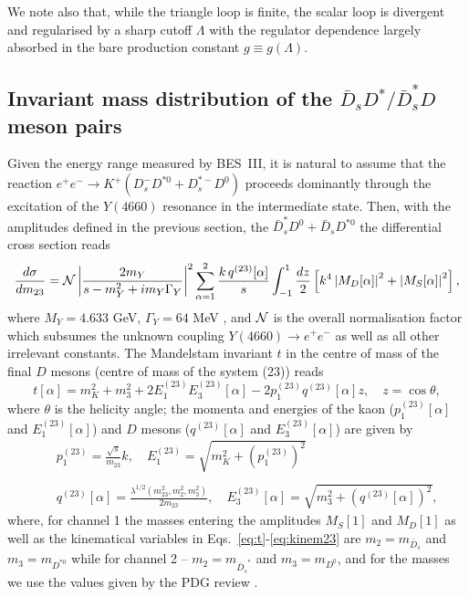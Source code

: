 \documentclass[preprint,12pt,3p]{elsarticle}
\newcommand{\be}{\begin{equation}}
\newcommand{\ee}{\end{equation}}
\newcommand{\bea}{\begin{eqnarray}}
\newcommand{\eea}{\end{eqnarray}}
\begin{document}
We note also that, while the triangle loop is finite, the scalar loop is divergent and regularised by a sharp cutoff $\Lambda$ with the regulator dependence 
largely absorbed in the bare production constant $g\equiv g(\Lambda)$. 

\subsection{Invariant mass distribution of the $\bar{D}_s D^*/ \bar{D}_s^* D$ meson pairs}
\label{Sec:rate}

Given the energy range measured by BES~III, it is natural to assume that the reaction $e^+e^-\to K^+(D^-_sD^{*0} + D^{*-}_s D^0)$ proceeds dominantly through the excitation of the $Y(4660)$ resonance in the intermediate state. Then, with the amplitudes defined in the previous section, the $\bar{D}_{s}^*D^0 + \bar{D}_{s}D^{*0}$ the differential cross section reads
\be
\frac{d \sigma}{dm_{23}}={\cal N} 
\left|\frac{2m_{Y}}{s-m_Y^2+im_Y\Gamma_Y}\right|^2 \sum_{\alpha=1}^2\frac{ k\, q^{(23)}[\alpha]}{s}
\int_{-1}^1\frac{dz}{2} \left[k^4\left|M_D[\alpha]\right|^2+\left|M_S[\alpha]\right|^2\right],
\label{eq:rate}
\ee
where $M_Y=4.633$ GeV, $\Gamma_Y=64$ MeV \cite{Zyla:2020zbs}, and ${\cal N}$ is the overall normalisation factor which subsumes the unknown coupling $Y(4660) \to e^+e^-$ as well as all other irrelevant constants. The Mandelstam invariant $t$ in the centre of mass of the final $D$ mesons (centre of mass of the system (23)) reads
\be
t[\alpha]=m_K^2+m_3^2+2E_1^{(23)}E_3^{(23)}[\alpha]-2p_1^{(23)}q^{(23)}[\alpha]z,\quad z=\cos\theta,
\label{eq:t}
\ee
where $\theta$ is the helicity angle; the momenta and energies of the
kaon ($p_1^{(23)}[\alpha]$ and $ E_1^{(23)}[\alpha]$) and $D$ mesons ($q^{(23)}[\alpha]$ and $ E_3^{(23)}[\alpha]$) are given by
\bea\label{eq:kinem23}
&&p_1^{(23)}=\frac{\sqrt{s}}{m_{23}} k,\quad E_1^{(23)}=\sqrt{m_K^2+{(p_1^{(23)})}^2} \nonumber\\[-2mm]
\\[-2mm]
&&q^{(23)}[\alpha]=\frac{\lambda^{1/2}(m_{23}^2,m_2^2,m_3^2)}{2m_{23}},\quad E_3^{(23)}[\alpha]=\sqrt{m_3^2+{\left(q^{(23)}[\alpha]\right)}^2},\nonumber 
\eea
where, for channel 1 the masses entering the amplitudes $M_S[1]$ and $M_D[1]$ as well as the kinematical variables in Eqs.~\eqref{eq:t}-\eqref{eq:kinem23} are $m_2=m_{\bar{D}_s}$ and $m_3= m_{D^{*0}}$ while for channel 2 -- 
$m_2=m_{{\bar{D}_s}^*}$ and $m_3=m_{D^0}$, and for the masses we use the values given by the PDG review 
\cite{Zyla:2020zbs}.
\end{document}
